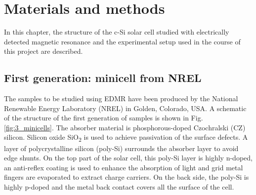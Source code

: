 \documentclass[a4paper]{book}
\newcommand{\tsub}{\textsubscript}
\begin{document}
	\chapter{Materials and methods}
	In this chapter, the structure of the c-Si solar cell studied with electrically detected magnetic resonance and the experimental setup used in the course of this project are described.
	
	\section{First generation: minicell from NREL}
	The samples to be studied using EDMR have been produced by the National Renewable Energy Laboratory (NREL) in Golden, Colorado, USA. A schematic of the structure of the first generation of samples is shown in Fig. \ref{fig:3_minicells}. The absorber material is phosphorous-doped Czochralski (CZ) silicon. Silicon oxide SiO\tsub 2 is used to achieve passivation of the surface defects. A layer of polycrystalline silicon (poly-Si) surrounds the absorber layer to avoid edge shunts. On the top part of the solar cell, this poly-Si layer is highly n-doped, an anti-reflex coating is used to enhance the absorption of light and grid metal fingers are evaporated to extract charge carriers. On the back side, the poly-Si is highly p-doped and the metal back contact covers all the surface of the cell.
\end{document}
